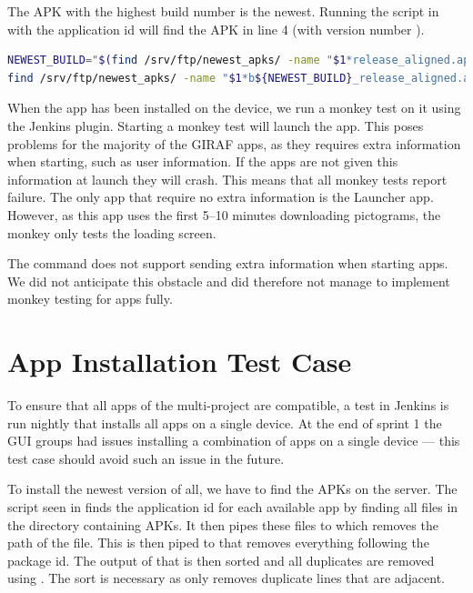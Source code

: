 The APK with the highest build number is the newest. Running the script in  with the application id  will find the APK in line 4 (with version number ).

\begin{lstlisting}[language=bash,showstringspaces=false,caption=Bash script that finds the newest APK for a particular application id,label=lst:find_newest_apk]
NEWEST_BUILD="$(find /srv/ftp/newest_apks/ -name "$1*release_aligned.apk" | sed 's/.*b//' | sed 's/_release_aligned.apk//' | awk '$0>x{x=$0};END{print x}')"
find /srv/ftp/newest_apks/ -name "$1*b${NEWEST_BUILD}_release_aligned.apk"
\end{lstlisting}

When the app has been installed on the device, we run a monkey test on it using the Jenkins plugin. Starting a monkey test will launch the app. This poses problems for the majority of the GIRAF apps, as they requires extra information when starting, such as user information. If the apps are not given this information at launch they will crash. This means that all monkey tests report failure. The only app that require no extra information is the Launcher app. However, as this app uses the first 5--10 minutes downloading pictograms, the monkey only tests the loading screen.

The  command does not support sending extra information when starting apps. We did not anticipate this obstacle and did therefore not manage to implement monkey testing for apps fully.


\section{App Installation Test Case}\label{sec:s3_appinstallationtest}
To ensure that all apps of the multi-project are compatible, a test in Jenkins is run nightly that installs all apps on a single device. At the end of sprint 1 the GUI groups had issues installing a combination of apps on a single device --- this test case should avoid such an issue in the future.

To install the newest version of all, we have to find the APKs on the server. The script seen in  finds the application id for each available app by finding all files in the directory containing APKs. It then pipes these files to  which removes the path of the file. This is then piped to  that removes everything following the package id. The output of that is then sorted and all duplicates are removed using . The sort is necessary as  only removes duplicate lines that are adjacent.

